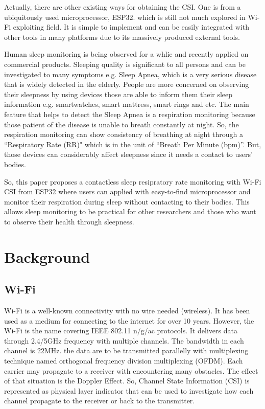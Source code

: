 \documentclass[10pt,letterpaper]{article}
\begin{document}
	Actually, there are other existing ways for obtaining the CSI. One is from a ubiquitously used microprocessor, ESP32. which is still not much explored in Wi-Fi exploiting field. It is simple to implement and can be easily integrated with other tools in many platforms due to its massively produced external tools. 
	
	
	Human sleep monitoring is being observed for a whlie and recently applied on commercial products. Sleeping quality is significant to all persons and can be investigated to many symptoms e.g. Sleep Apnea, which is a very serious disease that is widely detected in the elderly. People are more concerned on observing their sleepness by using devices those are able to inform them their sleep information e.g. smartwatches, smart mattress, smart rings and etc. The main feature that helps to detect the Sleep Apnea is a respiration monitoring because those patient of the disease is unable to breath constantly at night. So, the respiration monitoring can show consistency of breathing at night through a ``Respiratory Rate (RR)" which is in the unit of ``Breath Per Minute (bpm)''. But, those devices can considerably affect sleepness since it needs a contact to users' bodies. 
	
	So, this paper proposes a contactless sleep resipratory rate monitoring with Wi-Fi CSI from ESP32 where users can applied with easy-to-find microprocessor and monitor their respiration during sleep without contacting to their bodies.
	This allows sleep monitoring to be practical for other researchers and those who want to observe their health through sleepness.
	
	
	
	\section*{Background}
	
	\subsection*{Wi-Fi}\label{wifi}
	
	Wi-Fi is a well-known connectivity with no wire needed (wireless). It has been used as a medium for connecting to the internet for over 10 years. However, the Wi-Fi is the name covering IEEE 802.11 n/g/ac protocols. It delivers data through 2.4/5GHz frequency with multiple channels. The bandwidth in each channel is 22MHz. the data are to be transmitted  parallelly with multiplexing technique named orthogonal frequency division multiplexing (OFDM). Each carrier may propagate to a receiver with encountering many obstacles. The effect of that situation is the Doppler Effect.
	So, Channel State Information (CSI) is represented as physical layer indicator that can be used to investigate how each channel propagate to the receiver or back to the transmitter.
	
\end{document}
